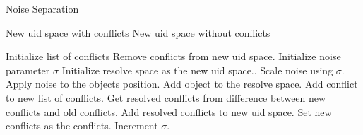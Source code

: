\documentclass[conference]{IEEEtran}
\begin{document}
    \begin{algorithm}
        \caption{Noise Separation}
        \label{noise_sep}
        \begin{algorithmic}
            \renewcommand{\algorithmicrequire}{\textbf{Input:}}
            \renewcommand{\algorithmicensure}{\textbf{Output:}}
            \REQUIRE New uid space with conflicts
            \ENSURE New uid space without conflicts

            \STATE Initialize list of conflicts
            \STATE Remove conflicts from new uid space.
            \STATE Initialize noise parameter $\sigma$
                \STATE Initialize resolve space as the new uid space..
                    \STATE Scale noise using $\sigma$.
                    \STATE Apply noise to the objects position.
                    \STATE Add object to the resolve space.
                        \STATE Add conflict to new list of conflicts.
                    \ENDIF
                \ENDFOR
                \STATE Get resolved conflicts from difference between new conflicts and old conflicts.
                \STATE Add resolved conflicts to new uid space.
                \STATE Set new conflicts as the conflicts.
                \STATE Increment $\sigma$.
            \ENDWHILE
        \end{algorithmic}
    \end{algorithm}
\end{document}
